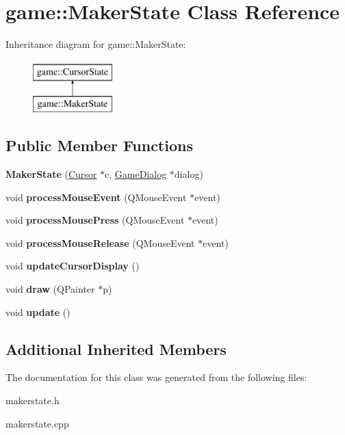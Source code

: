 \hypertarget{classgame_1_1MakerState}{}\section{game\+:\+:Maker\+State Class Reference}
\label{classgame_1_1MakerState}
Inheritance diagram for game\+:\+:Maker\+State\+:\begin{figure}[H]
\begin{center}
\leavevmode
\includegraphics[height=2.000000cm]{classgame_1_1MakerState}
\end{center}
\end{figure}
\subsection*{Public Member Functions}
\begin{DoxyCompactItemize}
\item 
\mbox{\label{classgame_1_1MakerState_a821b031d287b7602f7d6eff6b8fb9162}} 
{\bfseries Maker\+State} (\hyperlink{classgame_1_1Cursor}{Cursor} $\ast$c, \hyperlink{classgame_1_1GameDialog}{Game\+Dialog} $\ast$dialog)
\item 
\mbox{\label{classgame_1_1MakerState_a772ef3b0af5a00093b8270ae3a3dc9eb}} 
void {\bfseries process\+Mouse\+Event} (Q\+Mouse\+Event $\ast$event)
\item 
\mbox{\label{classgame_1_1MakerState_a7233722c5ba24ebc1c0e0d74930a7920}} 
void {\bfseries process\+Mouse\+Press} (Q\+Mouse\+Event $\ast$event)
\item 
\mbox{\label{classgame_1_1MakerState_a526d7ce9ce017fbbc279ba08217dc9cd}} 
void {\bfseries process\+Mouse\+Release} (Q\+Mouse\+Event $\ast$event)
\item 
\mbox{\label{classgame_1_1MakerState_ae89465bddd33a4c11b6ae31a6f58b66d}} 
void {\bfseries update\+Cursor\+Display} ()
\item 
\mbox{\label{classgame_1_1MakerState_a88bf5ae574e0e79ec78ec890f46738e8}} 
void {\bfseries draw} (Q\+Painter $\ast$p)
\item 
\mbox{\label{classgame_1_1MakerState_aa61fa26dd0c3fbe35b1f7f7f4579a1f1}} 
void {\bfseries update} ()
\end{DoxyCompactItemize}
\subsection*{Additional Inherited Members}


The documentation for this class was generated from the following files\+:\begin{DoxyCompactItemize}
\item 
makerstate.\+h\item 
makerstate.\+cpp\end{DoxyCompactItemize}
